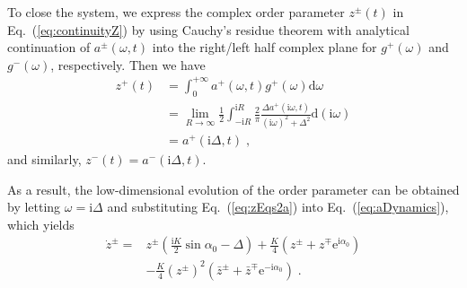 \documentclass{article}
\begin{document}
\color{blue}

To close the system, we express the complex order parameter $z^{\pm}\left( t \right)$ in Eq.~(\ref{eq:continuityZ}) by using Cauchy’s residue theorem with analytical continuation of $a^{\pm}\left( \omega ,t \right)$ into the right/left half complex plane for $g^{+}\left(\omega\right)$ and $g^{-}\left(\omega\right)$, respectively. Then we have
\begin{equation}
    \begin{aligned}
        z^+\left( t \right) &=\int_0^{+\infty}{a^+\left( \omega ,t \right) g^+\left( \omega \right) \mathrm{d}\omega}\\
        &=\lim_{R\rightarrow \infty} \frac{1}{2}\int_{-\mathrm{i}R}^{\mathrm{i}R}{\frac{2}{\pi}\frac{\Delta a^+\left( \mathrm{i}\omega ,t \right)}{\left( \mathrm{i}\omega \right) ^2+\Delta ^2}\mathrm{d}\left( \mathrm{i}\omega \right)}\\
        &=a^+\left( \mathrm{i}\Delta ,t \right) \;,
    \end{aligned}
\end{equation}
and similarly, $z^-\left( t \right)=a^-\left( \mathrm{i}\Delta ,t \right)$.

As a result, the low-dimensional evolution of the order parameter can be obtained by letting $\omega =\mathrm{i}\Delta$ and substituting Eq.~(\ref{eq:zEqs2a}) into Eq.~(\ref{eq:aDynamics}), which yields
\begin{equation}
    \label{eq:zDynamics}
    \begin{aligned}
        \dot{z}^{\pm}=&z^{\pm}\left( \frac{\text{i}K}{2}\sin \alpha _0 - \Delta \right) +\frac{K}{4}\left( z^{\pm}+z^{\mp}\text{e}^{\text{i}\alpha _0} \right)\\
        &-\frac{K}{4}\left( z^{\pm} \right) ^2\left( \bar{z}^{\pm}+\bar{z}^{\mp}\text{e}^{-\text{i}\alpha _0} \right) \;.\\
    \end{aligned}
\end{equation}
\end{document}
